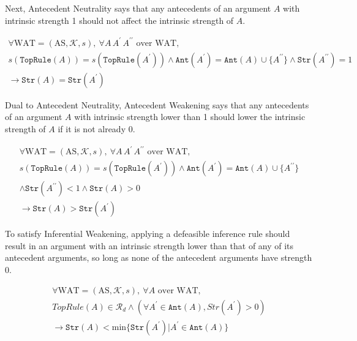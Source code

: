 \documentclass[runningheads]{llncs}
\newcommand{\Rd}{\mathcal{R}_d}
\newcommand{\K}{\mathcal{K}}
\newcommand{\pr}{^\prime}
\newcommand{\TopRule}{\texttt{TopRule}}
\newcommand{\Ant}{\texttt{Ant}}
\newcommand{\Str}{\texttt{Str}}
\begin{document}
Next, Antecedent Neutrality says that any antecedents of an argument $A$ with intrinsic strength 1 should not affect the intrinsic strength of $A$.
\begin{principle}
\begin{multline*}
    \forall \text{WAT} = ( \text{AS}, \K, s ),\ \forall A\, A\pr\, A^{\prime\prime} \text{ over WAT},\\s(\TopRule(A)) = s(\TopRule(A\pr)) \wedge \Ant(A\pr) = \Ant(A) \cup \{A^{\prime\prime}\} \wedge \Str(A^{\prime\prime}) = 1\\\rightarrow \Str(A) = \Str(A\pr)
\end{multline*}
\end{principle}

Dual to Antecedent Neutrality, Antecedent Weakening says that any antecedents of an argument $A$ with intrinsic strength lower than 1 should lower the intrinsic strength of $A$ if it is not already 0.
\begin{principle}
\begin{multline*}
    \forall \text{WAT} = ( \text{AS}, \K, s ),\ \forall A\, A\pr\, A^{\prime\prime} \text{ over WAT},\\s(\TopRule(A)) = s(\TopRule(A\pr)) \wedge \Ant(A\pr) = \Ant(A) \cup \{A^{\prime\prime}\}\\\wedge \Str(A^{\prime\prime}) < 1 \wedge \Str(A) > 0\\\rightarrow \Str(A) > \Str(A\pr)
\end{multline*}
\end{principle}

To satisfy Inferential Weakening, applying a defeasible inference rule should result in an argument with an intrinsic strength lower than that of any of its antecedent arguments, so long as none of the antecedent arguments have strength 0.
\begin{principle}
\begin{multline*}
    \forall \text{WAT} = ( \text{AS}, \K, s ),\ \forall A \text{ over WAT},\\TopRule(A) \in \Rd \wedge (\forall A\pr \in \Ant(A), Str(A\pr) > 0)\\\rightarrow \Str(A) < \text{min}\{ \Str(A\pr) | A\pr \in \Ant(A)\}
\end{multline*}
\end{principle}
\end{document}
